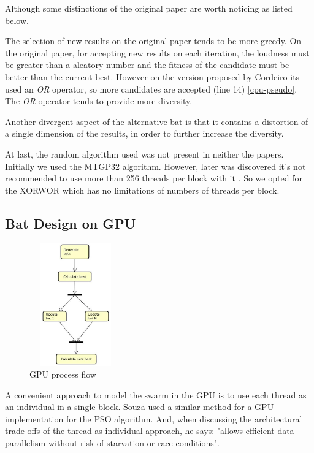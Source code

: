 \documentclass[conference]{IEEEtran}
\begin{document}
Although some distinctions of the original paper are worth noticing as listed below.

The selection of new results on the original paper tends to be more
greedy. On the original paper, for accepting new results on each
iteration, the loudness must be greater than a aleatory number and the
fitness of the candidate must be better than the current best.
However on the version proposed by Cordeiro \cite{comparisonBatParpinelli} its used
an \textit{OR} operator, so more candidates are accepted (line 14) \ref{cpu-pseudo}.
The \textit{OR} operator tends to provide more diversity.

Another divergent aspect of the alternative bat is that
it contains a distortion of a single dimension of the results, in order 
to further increase the diversity.

At last, the random algorithm used was not present in neither the
papers. Initially we used the MTGP32 algorithm. However, later was
discovered it's not recommended to use more than 256 threads per block
with it \cite{curandIssue}. So we opted for the XORWOR which has no
limitations of numbers of threads per block.


\subsection{Bat Design on GPU}

\begin{figure}[H]
    \begin{center}
    \includegraphics[width=150px,height=200px]{activity}
    \end{center}
    \caption{GPU process flow}
    \label{processFlow}
\end{figure}

A convenient approach to model the swarm in the GPU is to use each
thread as an individual in a single block. Souza \cite{pso-gpu} used a similar method for
a GPU implementation for the PSO algorithm. And, when discussing the
architectural trade-offs of the thread as individual approach, he says:
"allows efficient data parallelism without risk of starvation or race
conditions".
\end{document}

